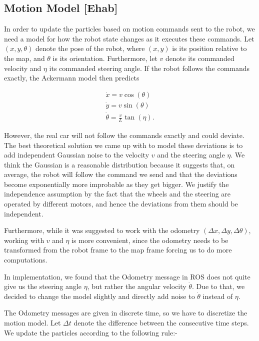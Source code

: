 \documentclass[11pt,twocolumn]{article}
\begin{document}
\subsection{Motion Model [Ehab]}

In order to update the particles based on motion commands sent to the robot, we need a model for how the robot state changes as it executes these commands. Let $(x,y,\theta)$ denote the pose of the robot, where $(x,y)$ is its position relative to the map, and $\theta$ is its orientation. Furthermore, let $v$ denote its commanded velocity and $\eta$ its commanded steering angle. If the robot follows the commands exactly, the Ackermann model then predicts

\begin{subequations}
    \begin{gather}
        \dot{x}=v \cos(\theta)\\
        \dot{y}=v \sin(\theta)\\
        \dot{\theta}=\frac{v}{L} \tan(\eta).
    \end{gather}
\end{subequations}

However, the real car will not follow the commands exactly and could deviate. The best theoretical solution we came up with to model these deviations is to add independent Gaussian noise to the velocity $v$ and the steering angle $\eta$. We think the Gaussian is a reasonable distribution because it suggests that, on average, the robot will follow the command we send and that the deviations become exponentially more improbable as they get bigger. We justify the independence assumption by the fact that the wheels and the steering are operated by different motors, and hence the deviations from them should be independent.

Furthermore, while it was suggested to work with the odometry $(\Delta x,\Delta y,\Delta \theta)$, working with $v$ and $\eta$ is more convenient, since the odometry needs to be transformed from the robot frame to the map frame forcing us to do more computations.

In implementation, we found that the Odometry message in ROS does not quite give us the steering angle $\eta$, but rather the angular velocity $\dot{\theta}$. Due to that, we decided to change the model slightly and directly add noise to $\dot{\theta}$ instead of $\eta$.

The Odometry messages are given in discrete time, so we have to discretize the motion model. Let $\Delta t$ denote the difference between the consecutive time steps. We update the particles according to the following rule:-
\end{document}
